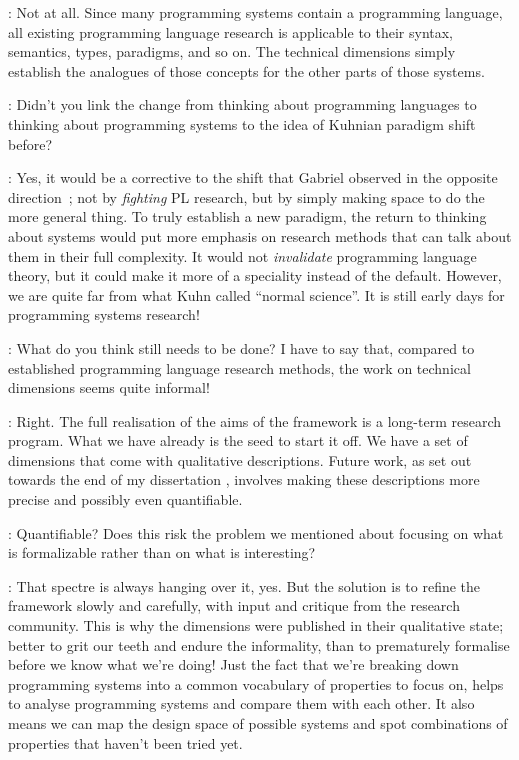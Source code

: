 \documentclass[runningheads]{llncs}
\newcommand{\T}{Tomas}
\newcommand{\J}{Joel}
\newcommand{\says}[2][gg]{\vspace{0.5em}\noindent\hangindent=0.5cm{\textsc{#1}}: #2}
\begin{document}
\says[\J]{Not at all. Since many programming systems contain a programming language, all existing programming language research is applicable to their syntax, semantics, types, paradigms, and so on. The technical dimensions simply establish the analogues of those concepts for the other parts of those systems.}

\says[\T]{Didn't you link the change from thinking about programming languages to thinking about programming systems to the idea of Kuhnian paradigm shift before?}

\says[\J]{Yes, it would be a corrective to the shift that Gabriel observed in the opposite direction\ \cite{rpg-2012-revolution}; not by \emph{fighting} PL research, but by simply making space to do the more general thing. To truly establish a new paradigm, the return to thinking about systems would put more emphasis on research methods that can talk about them in their full complexity. It would not \emph{invalidate} programming language theory, but it could make it more of a speciality instead of the default. However, we are quite far from what Kuhn called ``normal science''. It is still early days for programming systems research!}

\says[\T]{What do you think still needs to be done? I have to say that, compared to established programming language research methods, the work on technical dimensions seems quite informal!}

\says[\J]{Right. The full realisation of the aims of the framework is a long-term research program. What we have already is the seed to start it off. We have a set of dimensions that come with qualitative descriptions. Future work, as set out towards the end of my dissertation \cite{jakubovic-2024-phd}, involves making these descriptions more precise and possibly even quantifiable.}

\says[\T]{Quantifiable? Does this risk the problem we mentioned about focusing on what is formalizable rather than on what is interesting?}

\says[\J]{That spectre is always hanging over it, yes. But the solution is to refine the framework slowly and carefully, with input and critique from the research community. This is why the dimensions were published in their qualitative state; better to grit our teeth and endure the informality, than to prematurely formalise before we know what we're doing! Just the fact that we're breaking down programming systems into a common vocabulary of properties to focus on, helps to analyse programming systems and compare them with each other. It also means we can map the design space of possible systems and spot combinations of properties that haven't been tried yet.}
\end{document}
